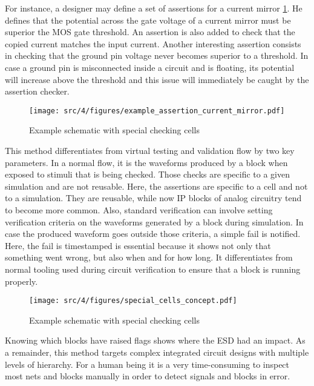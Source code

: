 For instance, a designer may define a set of assertions for a current mirror \ref{fig:ex-current-mirror-assert}.
He defines that the potential across the gate voltage of a current mirror must be superior the MOS gate threshold.
An assertion is also added to check that the copied current matches the input current.
Another interesting assertion consists in checking that the ground pin voltage never becomes superior to a threshold.
In case a ground pin is misconnected inside a circuit and is floating, its potential will increase above the threshold and this issue will immediately be caught by the assertion checker.

\begin{figure}[!h]
  \centering
  \texttt{[image: src/4/figures/example\_assertion\_current\_mirror.pdf]}
  \caption{Example schematic with special checking cells}
  \label{fig:ex-current-mirror-assert}
\end{figure}

This method differentiates from virtual testing and validation flow by two key parameters.
In a normal flow, it is the waveforms produced by a block when exposed to stimuli that is being checked.
Those checks are specific to a given simulation and are not reusable.
Here, the assertions are specific to a cell and not to a simulation.
They are reusable, while now IP blocks of analog circuitry tend to become more common.
Also, standard verification can involve setting verification criteria on the waveforms generated by a block during simulation.
In case the produced waveform goes outside those criteria, a simple fail is notified.
Here, the fail is timestamped is essential because it shows not only that something went wrong, but also when and for how long.
It differentiates from normal tooling used during circuit verification to ensure that a block is running properly.

\begin{figure}[!h]
  \centering
  \texttt{[image: src/4/figures/special\_cells\_concept.pdf]}
  \caption{Example schematic with special checking cells}
  \label{fig:ex-special-cells}
\end{figure}

Knowing which blocks have raised flags shows where the ESD had an impact.
As a remainder, this method targets complex integrated circuit designs with multiple levels of hierarchy.
For a human being it is a very time-consuming to inspect most nets and blocks manually in order to detect signals and blocks in error.

